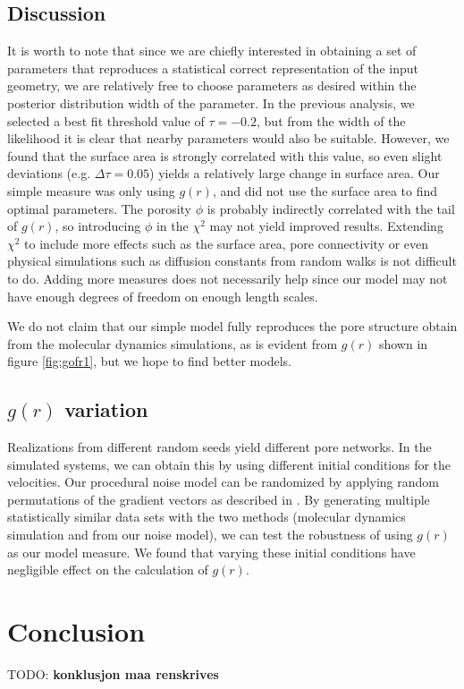 \documentclass[aps,pre,twocolumn,letterpaper,floatfix,showpacs]{revtex4}
\newcommand{\todo}[1]{ {\color{Magenta} TODO: \color{Blue} \textbf{#1} }}
\begin{document}
\subsection{Discussion}
It is worth to note that since we are chiefly interested in obtaining a set of
parameters that reproduces a statistical correct representation of the input geometry,
we are relatively free to choose parameters as desired within the posterior distribution width of the parameter.
In the previous analysis, we selected a best fit threshold value of $\tau=-0.2$,
but from the width of the likelihood it is clear that nearby parameters would also be suitable. 
However, we found that the surface area is strongly correlated with this value, so even slight
deviations (e.g. $\Delta \tau = 0.05$) yields a relatively large change in surface area.
Our simple measure was only using $g(r)$, and did not use the surface area to find optimal parameters.
The porosity $\phi$ is probably indirectly correlated with the tail of $g(r)$, so introducing $\phi$ in the $\chi^2$ may not yield improved results.
Extending $\chi^2$ to include more effects such as the surface area, pore connectivity or even physical simulations such as diffusion constants from random walks is not difficult to do.
Adding more measures does not necessarily help since our model may not have enough degrees of freedom on enough length scales.

We do not claim that our simple model fully reproduces the pore structure obtain from the molecular dynamics simulations, as is evident from $g(r)$ shown in figure \ref{fig:gofr1},
but we hope to find better models.

\subsection{$g(r)$ variation}
Realizations from different random seeds yield different pore networks.
In the simulated systems, we can obtain this by using different initial conditions for the velocities.
Our procedural noise model can be randomized by applying random permutations of the gradient vectors as described in \cite{perlin1985image}.
By generating multiple statistically similar data sets with the two methods (molecular dynamics simulation and from our noise model), we can test the robustness of using $g(r)$ as our model measure.
We found that varying these initial conditions have negligible effect on the calculation of $g(r)$.

\section{Conclusion}
\todo{konklusjon maa renskrives}
\end{document}
